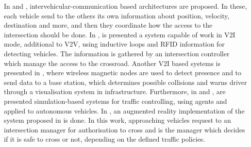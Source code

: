 
In \cite{Ball2010} and \cite{Azimi2012}, intervehicular-communication based architectures are proposed. In these, each vehicle send to the others its own information about position, velocity, destination and more, and then they coordinate how the access to the intersection should be done. In \cite{Guerrero-Ibanez2013}, is presented a system capable of work in V2I mode, additional to V2V, using inductive loops and RFID information for detecting vehicles. The information is gathered by an intersection controller which manage the access to the crossroad. Another V2I based systems is presented in \cite{Basma2011}, where wireless magnetic nodes are used to detect presence and to send data to a base station, which determines possible collisions and warns driver through a visualisation system in infrastructure. Furthermore, in \cite{Dresner2008} and \cite{CondeBento2012}, are presented simulation-based systems for traffic controlling, using agents and applied to autonomous vehicles. In \cite{Quinlan2010}, an augmented reality implementation of the system proposed in \cite{Dresner2008} is done. In this work, approaching vehicles request to an intersection manager for authorisation to cross and is the manager which decides if it is safe to cross or not, depending on the defined traffic policies.

